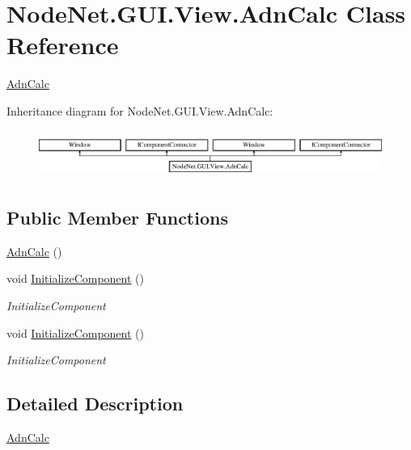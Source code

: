 \hypertarget{class_node_net_1_1_g_u_i_1_1_view_1_1_adn_calc}{}\section{Node\+Net.\+G\+U\+I.\+View.\+Adn\+Calc Class Reference}
\label{class_node_net_1_1_g_u_i_1_1_view_1_1_adn_calc}


\hyperlink{class_node_net_1_1_g_u_i_1_1_view_1_1_adn_calc}{Adn\+Calc}  


Inheritance diagram for Node\+Net.\+G\+U\+I.\+View.\+Adn\+Calc\+:\begin{figure}[H]
\begin{center}
\leavevmode
\includegraphics[height=1.573034cm]{class_node_net_1_1_g_u_i_1_1_view_1_1_adn_calc}
\end{center}
\end{figure}
\subsection*{Public Member Functions}
\begin{DoxyCompactItemize}
\item 
\hyperlink{class_node_net_1_1_g_u_i_1_1_view_1_1_adn_calc_ad44a0368f9e6d2cad0d739935a7748a1}{Adn\+Calc} ()
\item 
void \hyperlink{class_node_net_1_1_g_u_i_1_1_view_1_1_adn_calc_adb56d2c16a08434849671d1ab56317d6}{Initialize\+Component} ()
\begin{DoxyCompactList}\small\item\em Initialize\+Component \end{DoxyCompactList}\item 
void \hyperlink{class_node_net_1_1_g_u_i_1_1_view_1_1_adn_calc_adb56d2c16a08434849671d1ab56317d6}{Initialize\+Component} ()
\begin{DoxyCompactList}\small\item\em Initialize\+Component \end{DoxyCompactList}\end{DoxyCompactItemize}


\subsection{Detailed Description}
\hyperlink{class_node_net_1_1_g_u_i_1_1_view_1_1_adn_calc}{Adn\+Calc} 



